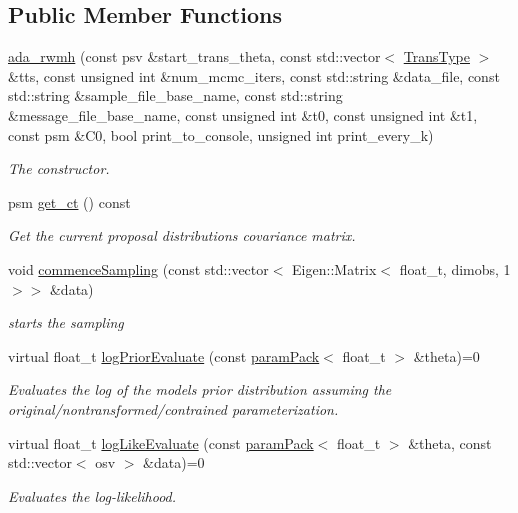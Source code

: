 \subsection*{Public Member Functions}
\begin{DoxyCompactItemize}
\item 
\hyperlink{classada__rwmh_a6bf39cdf5a3a5aec9baa3018364131d6}{ada\+\_\+rwmh} (const psv \&start\+\_\+trans\+\_\+theta, const std\+::vector$<$ \hyperlink{param__transforms_8h_acee593b112f4fc85f850631b9c6aaae9}{Trans\+Type} $>$ \&tts, const unsigned int \&num\+\_\+mcmc\+\_\+iters, const std\+::string \&data\+\_\+file, const std\+::string \&sample\+\_\+file\+\_\+base\+\_\+name, const std\+::string \&message\+\_\+file\+\_\+base\+\_\+name, const unsigned int \&t0, const unsigned int \&t1, const psm \&C0, bool print\+\_\+to\+\_\+console, unsigned int print\+\_\+every\+\_\+k)
\begin{DoxyCompactList}\small\item\em The constructor. \end{DoxyCompactList}\item 
psm \hyperlink{classada__rwmh_a72d5898fe897cba162456f269f385ade}{get\+\_\+ct} () const
\begin{DoxyCompactList}\small\item\em Get the current proposal distribution\textquotesingle{}s covariance matrix. \end{DoxyCompactList}\item 
void \hyperlink{classada__rwmh_a5f7905f68c0b07541fa1729304f8988f}{commence\+Sampling} (const std\+::vector$<$ Eigen\+::\+Matrix$<$ float\+\_\+t, dimobs, 1 $>$$>$ \&data)
\begin{DoxyCompactList}\small\item\em starts the sampling \end{DoxyCompactList}\item 
virtual float\+\_\+t \hyperlink{classada__rwmh_a859004bc1e241d55fbb3f072cf43d994}{log\+Prior\+Evaluate} (const \hyperlink{classparamPack}{param\+Pack}$<$ float\+\_\+t $>$ \&theta)=0
\begin{DoxyCompactList}\small\item\em Evaluates the log of the model\textquotesingle{}s prior distribution assuming the original/nontransformed/contrained parameterization. \end{DoxyCompactList}\item 
virtual float\+\_\+t \hyperlink{classada__rwmh_a403b60eaee01171bf05a7c73b53ac28f}{log\+Like\+Evaluate} (const \hyperlink{classparamPack}{param\+Pack}$<$ float\+\_\+t $>$ \&theta, const std\+::vector$<$ osv $>$ \&data)=0
\begin{DoxyCompactList}\small\item\em Evaluates the log-\/likelihood. \end{DoxyCompactList}\end{DoxyCompactItemize}
